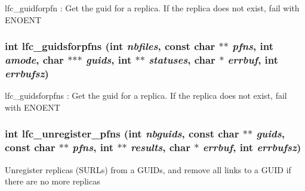 lfc\_\-guidforpfn : Get the guid for a replica. If the replica does not exist, fail with ENOENT 
\subsubsection{\setlength{\rightskip}{0pt plus 5cm}int lfc\_\-guidsforpfns (int {\em nbfiles}, const char $\ast$$\ast$ {\em pfns}, int {\em amode}, char $\ast$$\ast$$\ast$ {\em guids}, int $\ast$$\ast$ {\em statuses}, char $\ast$ {\em errbuf}, int {\em errbufsz})}\label{group__lfc__low__group_gf922973a476763abd5185fc13d2af9eb}


lfc\_\-guidsforpfns : Get the guid for a replica. If the replica does not exist, fail with ENOENT 
\subsubsection{\setlength{\rightskip}{0pt plus 5cm}int lfc\_\-unregister\_\-pfns (int {\em nbguids}, const char $\ast$$\ast$ {\em guids}, const char $\ast$$\ast$ {\em pfns}, int $\ast$$\ast$ {\em results}, char $\ast$ {\em errbuf}, int {\em errbufsz})}\label{group__lfc__low__group_g9ea58977487f9be50e91ba9857bc9510}


Unregister replicas (SURLs) from a GUIDs, and remove all links to a GUID if there are no more replicas 